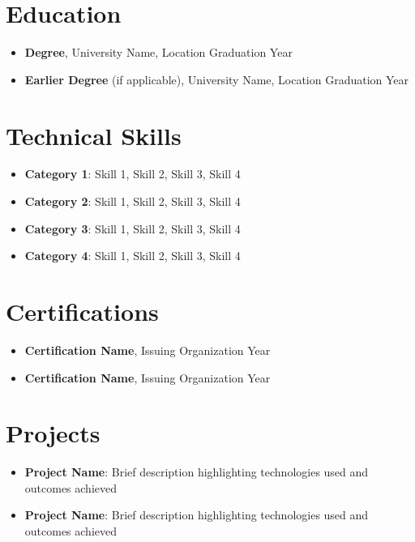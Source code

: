 \documentclass[a4paper,10pt]{article}
\begin{document}
\section*{Education}

\begin{itemize}
    \item {\bfseries Degree}, University Name, Location \hfill Graduation Year
    
    \item {\bfseries Earlier Degree} (if applicable), University Name, Location \hfill Graduation Year
\end{itemize}

\section*{Technical Skills}

\begin{itemize}
    \item {\bfseries Category 1}: Skill 1, Skill 2, Skill 3, Skill 4
    
    \item {\bfseries Category 2}: Skill 1, Skill 2, Skill 3, Skill 4
    
    \item {\bfseries Category 3}: Skill 1, Skill 2, Skill 3, Skill 4
    
    \item {\bfseries Category 4}: Skill 1, Skill 2, Skill 3, Skill 4
\end{itemize}

\section*{Certifications}

\begin{itemize}
    \item {\bfseries Certification Name}, Issuing Organization \hfill Year
    
    \item {\bfseries Certification Name}, Issuing Organization \hfill Year
\end{itemize}

\section*{Projects} %

\begin{itemize}
    \item {\bfseries Project Name}: Brief description highlighting technologies used and outcomes achieved
    
    \item {\bfseries Project Name}: Brief description highlighting technologies used and outcomes achieved
\end{itemize}
\end{document}
